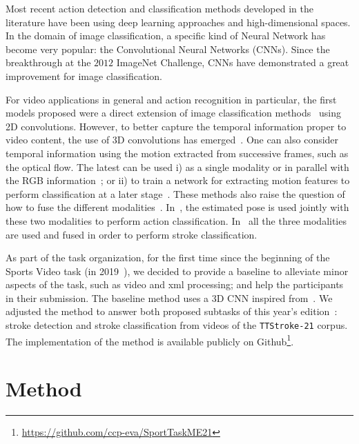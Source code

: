 \documentclass[sigconf]{acmart-me}
\begin{document}
Most recent action detection and classification methods developed in the literature have been using deep learning approaches and high-dimensional spaces. In the domain of image classification, a specific kind of Neural Network has become very popular: the Convolutional Neural Networks (CNNs). Since the breakthrough at the $2012$ ImageNet Challenge, CNNs have demonstrated a great improvement for image classification.
\par
For video applications in general and action recognition in particular, the first models proposed were a direct extension of image classification methods~\cite{Hakan:2018, NN:SimonyanTwoStream:2014} using 2D convolutions. However, to better capture the temporal information proper to video content, the use of 3D convolutions has emerged~\citep{NN:3DCNN_first:2007,NN:3DCNN:2017}. One can also consider temporal information using the motion extracted from successive frames, such as the optical flow. The latest can be used i) as a single modality or in parallel with the RGB information~\citep{NN:TwoStream3D:2018, NN:I3DCarreira:2017, NN:SimonyanTwoStream:2014, TT:OFSingularitiesForStrokeClassification:2019}; or ii) to train a network for extracting motion features to perform classification at a later stage~\cite{NN:3DCNNMimiciMotionForCLassification:2019}. These methods also raise the question of how to fuse the different modalities~\citep{NN:TwoStreamFusion:2016, PeThesis2020}. In~\cite{Pose:ActionRecognitionAndPoseEstimation:2018, Pose:LCRNet++:2020}, the estimated pose is used jointly with these two modalities to perform action classification. In~\cite{Pe:3stream:2021} all the three modalities are used and fused in order to perform stroke classification.
\par
As part of the task organization, for the first time since the beginning of the Sports Video task (in 2019~\citep{PeMETask:2019}), we decided to provide a baseline to alleviate minor aspects of the task, such as video and xml processing; and help the participants in their submission. The baseline method uses a 3D CNN inspired from~\cite{PeMEWork:2019,PeCBMI:2018}. We adjusted the method to answer both proposed subtasks of this year's edition~\cite{mediaeval/Martin21/task}: stroke detection and stroke classification from videos of the \texttt{TTStroke-21} corpus. The implementation of the method is available publicly on Github\footnote{\url{https://github.com/ccp-eva/SportTaskME21}}.

\vspace{-5pt}
\section{Method}
\label{sec:dataset}
\end{document}
